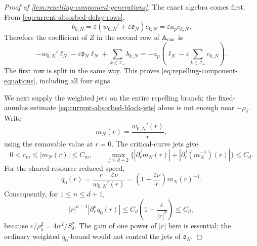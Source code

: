 \begin{proof}[Proof of
\cref{lem:repelling-component-generations}]
The exact algebra comes first.  From
\cref{eq:current-absorbed-delay-rows},
\[
 b_{k,N}=\varepsilon
    (w_{0,N}'+\varepsilon\mathfrak d_N)c_{k,N}
 =\varepsilon a_pc_{k,N}.
\]
Therefore the coefficient of \(Z\) in the second row of
\(\mathbb A_{\rm cur}\) is
\[
 -w_{0,N}'\ell_N-\varepsilon\mathfrak d_N\ell_N
       +\sum_{k\in\mathcal I_+}b_{k,N}
 =-a_p\left(\ell_N-\varepsilon
                 \sum_{k\in\mathcal I_+}c_{k,N}\right).
\]
The first row is split in the same way.  This proves
\cref{eq:repelling-component-equations}, including all four signs.

We next supply the weighted jets on the entire repelling branch; the
fixed-annulus estimate \cref{eq:current-absorbed-block-jets} alone is not
enough near \(-\rho_\delta\).  Write
\[
 m_N(r)=\frac{w_{0,N}'(r)}r,
\]
using the removable value at \(r=0\).  The critical-curve jets give
\[
 0<c_m\le |m_N(r)|\le C_m,\qquad
 \max_{j\le d+2}\bigl\{|\partial_r^jm_N(r)|
             +|\partial_r^j(m_N^{-1})(r)|\bigr\}\le C_d.
\]
For the shared-resource reduced speed,
\begin{equation}
 q_0(r)=\frac{r-\varepsilon\nu}{w_{0,N}'(r)}
       =\left(1-\frac{\varepsilon\nu}{r}\right)m_N(r)^{-1}.
                                                               \label{eq:repelling-q0-quotient}
\end{equation}
Consequently, for \(1\le n\le d+1\),
\begin{equation}
 |r|^{n-1}|\partial_r^nq_0(r)|
 \le C_d\left(1+\frac{\varepsilon}{|r|^2}\right)
 \le C_d,                                            \label{eq:repelling-q0-improved-jets}
\end{equation}
because
\(\varepsilon/\rho_\delta^2=4\alpha^2/S_\delta^2\).
The gain of one power of \(|r|\) here is essential; the ordinary weighted
\(q_0\)-bound would not control the jets of \(\mathfrak d_N\).


\end{proof}
